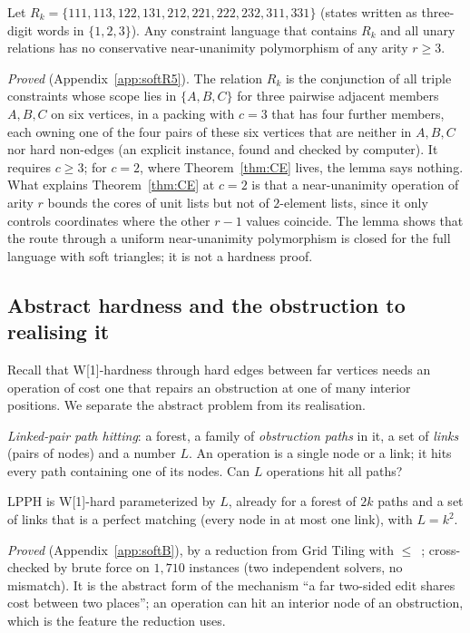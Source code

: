 \begin{lemma}\label{lem:R5}
Let $R_k=\{111,113,122,131,212,221,222,232,311,331\}$ (states written as three-digit words in $\{1,2,3\}$). Any constraint language that contains $R_k$ and all unary relations has no conservative near-unanimity polymorphism of any arity $r\ge3$.
\end{lemma}
\emph{Proved} (Appendix~\ref{app:softR5}). The relation $R_k$ is the conjunction of all triple constraints whose scope lies in $\{A,B,C\}$ for three pairwise adjacent members $A,B,C$ on six vertices, in a packing with $c=3$ that has four further members, each owning one of the four pairs of these six vertices that are neither in $A,B,C$ nor hard non-edges (an explicit instance, found and checked by computer). It requires $c\ge3$; for $c=2$, where Theorem~\ref{thm:CE} lives, the lemma says nothing. What explains Theorem~\ref{thm:CE} at $c=2$ is that a near-unanimity operation of arity $r$ bounds the cores of unit lists but not of $2$-element lists, since it only controls coordinates where the other $r-1$ values coincide. The lemma shows that the route through a uniform near-unanimity polymorphism is closed for the full language with soft triangles; it is not a hardness proof.

\subsection{Abstract hardness and the obstruction to realising it}\label{sec:softhard}
Recall that W[1]-hardness through hard edges between far vertices needs an operation of cost one that repairs an obstruction at one of many interior positions. We separate the abstract problem from its realisation.
\begin{definition}[LPPH]
\emph{Linked-pair path hitting}: a forest, a family of \emph{obstruction paths} in it, a set of \emph{links} (pairs of nodes) and a number $L$. An operation is a single node or a link; it hits every path containing one of its nodes. Can $L$ operations hit all paths?
\end{definition}
\begin{theorem}\label{thm:B}
LPPH is W[1]-hard parameterized by $L$, already for a forest of $2k$ paths and a set of links that is a perfect matching (every node in at most one link), with $L=k^2$.
\end{theorem}
\emph{Proved} (Appendix~\ref{app:softB}), by a reduction from Grid Tiling with $\le$~\cite{Cygan15}; cross-checked by brute force on $1{,}710$ instances (two independent solvers, no mismatch). It is the abstract form of the mechanism ``a far two-sided edit shares cost between two places''; an operation can hit an interior node of an obstruction, which is the feature the reduction uses.

